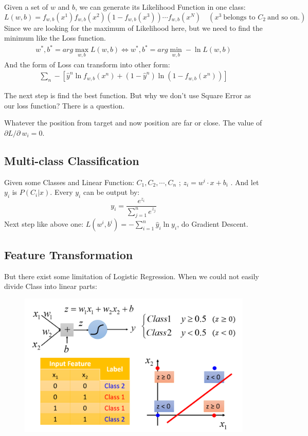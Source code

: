 \documentclass{article}
\begin{document}
Given a set of $w$ and $b$, we can generate its Likelihood Function in one class:
$$
L(w,b)=f_{w,b}(x^1)f_{w,b}(x^2)\left(1-f_{w,b}(x^3)\right)\cdots f_{w,b}(x^N) \quad (x^3 \  \text{belongs to }C_2\ \text{and so on.})
$$
Since we are looking for the maximum of Likelihood here, but we need to find the minimum like the Loss function.
$$
\begin{aligned}w^*,b^*=arg\max_{w,b}L(w,b)\Leftrightarrow  w^*,b^*=arg\min_{w,b}-\ln L(w,b)\end{aligned}
$$
And the form of Loss can transform into other form:
$$
\begin{aligned}\sum_n-\left[\hat{y}^n\ln f_{w,b}(x^n)+(1-\hat{y}^n)\ln\left(1-f_{w,b}(x^n)\right)\right]\end{aligned}
$$

The next step is find the best function. But why we don't use Square Error as our loss function? There is a question.

\begin{markerblock}
    Whatever the position from target and now position are far or close. The value of $\partial L/\partial\ w_i = 0$. 
\end{markerblock}

\subsection{Multi-class Classification}

Given some Classes and Linear Function: $C_1,C_2,\cdots,C_n$ ; $z_i = w^i\cdot x + b_i$ . And let $y_i$ is $P(C_i|x)$. Every $y_i$ can be output by:
$$
y_i = \frac{e^{z_i}}{\sum_{j=1}^n e^{z_j}}
$$
Next step like above one: $L(w^i,b^i) = -\sum_{i=1}^n \hat{y}_i\ln y_i$, do Gradient Descent.

\subsection{Feature Transformation}

But there exist some limitation of Logistic Regression. When we could not easily divide Class into linear parts:

\begin{figure}[htbp]
  \centering
  \includegraphics[scale=0.3]{pic/ClassTran.png}
  \label{fig:my_label}
\end{figure}
\end{document}
